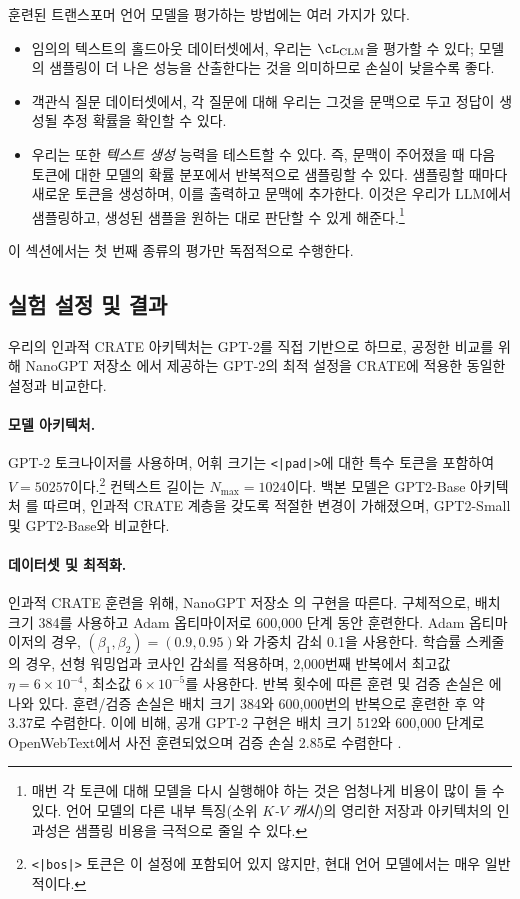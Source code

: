 \documentclass[../../book-main_ko.tex]{subfiles}
\begin{document}
훈련된 트랜스포머 언어 모델을 평가하는 방법에는 여러 가지가 있다.
\begin{itemize}
    \item 임의의 텍스트의 홀드아웃 데이터셋에서, 우리는 \(\cL_{\mathrm{CLM}}\)을 평가할 수 있다; 모델의 샘플링이 더 나은 성능을 산출한다는 것을 의미하므로 손실이 낮을수록 좋다.
    \item 객관식 질문 데이터셋에서, 각 질문에 대해 우리는 그것을 문맥으로 두고 정답이 생성될 추정 확률을 확인할 수 있다.
    \item 우리는 또한 \textit{텍스트 생성} 능력을 테스트할 수 있다. 즉, 문맥이 주어졌을 때 다음 토큰에 대한 모델의 확률 분포에서 반복적으로 샘플링할 수 있다. 샘플링할 때마다 새로운 토큰을 생성하며, 이를 출력하고 문맥에 추가한다. 이것은 우리가 LLM에서 샘플링하고, 생성된 샘플을 원하는 대로 판단할 수 있게 해준다.\footnote{매번 각 토큰에 대해 모델을 다시 실행해야 하는 것은 엄청나게 비용이 많이 들 수 있다. 언어 모델의 다른 내부 특징(소위 \textit{\(K\)-\(V\) 캐시})의 영리한 저장과 아키텍처의 인과성은 샘플링 비용을 극적으로 줄일 수 있다.}
\end{itemize}
이 섹션에서는 첫 번째 종류의 평가만 독점적으로 수행한다.

\subsection{실험 설정 및 결과}

우리의 인과적 CRATE 아키텍처는 GPT-2를 직접 기반으로 하므로, 공정한 비교를 위해 NanoGPT 저장소 \citep{nanogpt}에서 제공하는 GPT-2의 최적 설정을 CRATE에 적용한 동일한 설정과 비교한다.

\paragraph{모델 아키텍처.} GPT-2 토크나이저를 사용하며, 어휘 크기는 \texttt{<|pad|>}에 대한 특수 토큰을 포함하여 \(V = 50257\)이다.\footnote{\texttt{<|bos|>} 토큰은 이 설정에 포함되어 있지 않지만, 현대 언어 모델에서는 매우 일반적이다.} 컨텍스트 길이는 \(N_{\max} = 1024\)이다. 백본 모델은 GPT2-Base 아키텍처 \citep{radford2019language}를 따르며, 인과적 CRATE 계층을 갖도록 적절한 변경이 가해졌으며, GPT2-Small 및 GPT2-Base와 비교한다.

\paragraph{데이터셋 및 최적화.} 인과적 CRATE 훈련을 위해, NanoGPT 저장소 \citep{nanogpt}의 구현을 따른다. 구체적으로, 배치 크기 384를 사용하고 Adam 옵티마이저\citep{kingma2014adam}로 600,000 단계 동안 훈련한다. Adam 옵티마이저의 경우, $(\beta_1, \beta_2)=(0.9, 0.95)$와 가중치 감쇠 0.1을 사용한다. 학습률 스케줄의 경우, 선형 워밍업과 코사인 감쇠를 적용하며, 2,000번째 반복에서 최고값 $\eta=6\times 10^{-4}$, 최소값 $6\times 10^{-5}$를 사용한다. 반복 횟수에 따른 훈련 및 검증 손실은 에 나와 있다. 훈련/검증 손실은 배치 크기 384와 600,000번의 반복으로 훈련한 후 약 3.37로 수렴한다. 이에 비해, 공개 GPT-2 구현은 배치 크기 512와 600,000 단계로 OpenWebText에서 사전 훈련되었으며 검증 손실 2.85로 수렴한다 \citep{nanogpt}.
\end{document}
